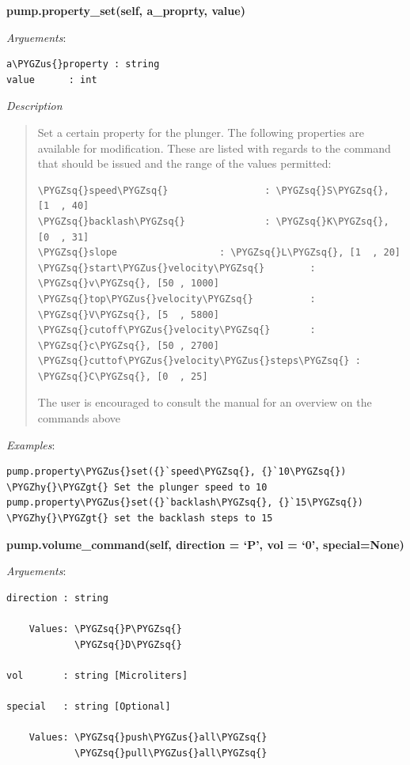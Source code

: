 \documentclass[letterpaper,10pt,english]{sphinxmanual}
\def\PYGZus{\char`\_}
\def\PYGZgt{\char`\>}
\def\PYGZhy{\char`\-}
\def\PYGZsq{\char`\'}
\begin{document}
\textbf{pump.property\_set(self, a\_proprty, value)}

\emph{Arguements}:

\begin{Verbatim}[commandchars=\\\{\}]
a\PYGZus{}property : string
value      : int
\end{Verbatim}

\emph{Description}
\begin{quote}

Set a certain property for the plunger. The following properties are available for
modification. These are listed with regards to the command that should be issued
and the range of the values permitted:

\begin{Verbatim}[commandchars=\\\{\}]
\PYGZsq{}speed\PYGZsq{}                 : \PYGZsq{}S\PYGZsq{}, [1  , 40]
\PYGZsq{}backlash\PYGZsq{}              : \PYGZsq{}K\PYGZsq{}, [0  , 31]
\PYGZsq{}slope                  : \PYGZsq{}L\PYGZsq{}, [1  , 20]
\PYGZsq{}start\PYGZus{}velocity\PYGZsq{}        : \PYGZsq{}v\PYGZsq{}, [50 , 1000]
\PYGZsq{}top\PYGZus{}velocity\PYGZsq{}          : \PYGZsq{}V\PYGZsq{}, [5  , 5800]
\PYGZsq{}cutoff\PYGZus{}velocity\PYGZsq{}       : \PYGZsq{}c\PYGZsq{}, [50 , 2700]
\PYGZsq{}cuttof\PYGZus{}velocity\PYGZus{}steps\PYGZsq{} : \PYGZsq{}C\PYGZsq{}, [0  , 25]
\end{Verbatim}

The user is encouraged to consult the manual for an overview on the
commands above
\end{quote}

\emph{Examples}:

\begin{Verbatim}[commandchars=\\\{\}]
pump.property\PYGZus{}set({}`speed\PYGZsq{}, {}`10\PYGZsq{}) \PYGZhy{}\PYGZgt{} Set the plunger speed to 10
pump.property\PYGZus{}set({}`backlash\PYGZsq{}, {}`15\PYGZsq{}) \PYGZhy{}\PYGZgt{} set the backlash steps to 15
\end{Verbatim}

\textbf{pump.volume\_command(self, direction = {}`P', vol = {}`0', special=None)}

\emph{Arguements}:

\begin{Verbatim}[commandchars=\\\{\}]
direction : string

    Values: \PYGZsq{}P\PYGZsq{}
            \PYGZsq{}D\PYGZsq{}

vol       : string [Microliters]

special   : string [Optional]

    Values: \PYGZsq{}push\PYGZus{}all\PYGZsq{}
            \PYGZsq{}pull\PYGZus{}all\PYGZsq{}
\end{Verbatim}
\end{document}
